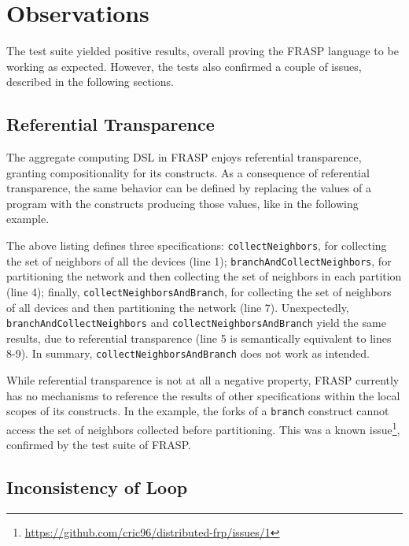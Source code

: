 
\section{Observations}
\label{section:verification:observations}

The test suite yielded positive results, overall proving the FRASP language to
be working as expected. However, the tests also confirmed a couple of issues,
described in the following sections.

\subsection{Referential Transparence}

The aggregate computing \ac{DSL} in FRASP enjoys referential transparence,
granting compositionality for its constructs. As a consequence of referential
transparence, the same behavior can be defined by replacing the values of a
program with the constructs producing those values, like in the following
example.



The above listing defines three specifications: \texttt{collectNeighbors}, for
collecting the set of neighbors of all the devices (line 1);
\texttt{branchAndCollectNeighbors}, for partitioning the network and then
collecting the set of neighbors in each partition (line 4); finally,
\texttt{collectNeighborsAndBranch}, for collecting the set of neighbors of all
devices and then partitioning the network (line 7). Unexpectedly,
\texttt{branchAndCollectNeighbors} and \texttt{collectNeighborsAndBranch} yield
the same results, due to referential transparence (line 5 is semantically
equivalent to lines 8-9). In summary, \texttt{collectNeighborsAndBranch} does
not work as intended.

While referential transparence is not at all a negative property, FRASP
currently has no mechanisms to reference the results of other specifications
within the local scopes of its constructs. In the example, the forks of a
\texttt{branch} construct cannot access the set of neighbors collected before
partitioning. This was a known issue\footnote{
\url{https://github.com/cric96/distributed-frp/issues/1}}, confirmed by the
test suite of FRASP.

\subsection{Inconsistency of Loop}

